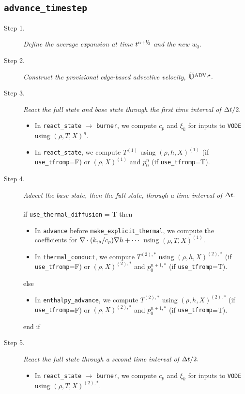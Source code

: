 \subsection{{\tt advance\_timestep}}
\begin{description}
\item[Step 1.] {\em Define the average expansion at time $t^\nph$ and the new $w_0.$}
\item[Step 2.] {\em Construct the provisional edge-based advective velocity, $\widetilde{\mathbf{U}}^{\mathrm{ADV},\star}.$}
\item[Step 3.] {\em React the full state and base state through the first time interval 
of $\Delta t/2.$}
\begin{itemize}
\item In {\tt react\_state} $\rightarrow$ {\tt burner}, we compute $c_p$ and $\xi_k$ 
for inputs to {\tt VODE} using $(\rho,T,X)^n$.
\item In {\tt react\_state}, we compute $T^{(1)}$ using $(\rho,h,X)^{(1)}$ 
(if {\tt use\_tfromp}=F) or $(\rho,X)^{(1)}$ and $p_0^n$ (if {\tt use\_tfromp}=T).
\end{itemize}
\item[Step 4.] {\em Advect the base state, then the full state, through a time interval 
of $\Delta t.$}\\ \\
if {\tt use\_thermal\_diffusion} = T then
\begin{itemize}
\item In {\tt advance} before {\tt make\_explicit\_thermal}, we compute the coefficients for 
$\nabla\cdot(k_{\rm th}/c_p)\nabla h + \cdots$ using $(\rho,T,X)^{(1)}$.
\item In {\tt thermal\_conduct}, we compute $T^{(2),*}$ using $(\rho,h,X)^{(2),*}$
(if {\tt use\_tfromp}=F) or $(\rho,X)^{(2),*}$ and $p_0^{n+1,*}$ (if {\tt use\_tfromp}=T).
\end{itemize}
else
\begin{itemize}
\item In {\tt enthalpy\_advance}, we compute $T^{(2),*}$ using $(\rho,h,X)^{(2),*}$
(if {\tt use\_tfromp}=F) or $(\rho,X)^{(2),*}$ and $p_0^{n+1,*}$ (if {\tt use\_tfromp}=T).
\end{itemize}
end if
\item[Step 5.] {\em React the full state through a second time interval of $\Delta t/2.$}
\begin{itemize}
\item In {\tt react\_state} $\rightarrow$ {\tt burner}, we compute $c_p$ and $\xi_k$ 
for inputs to {\tt VODE} using $(\rho,T,X)^{(2),*}$.

\end{itemize}
\end{description}
